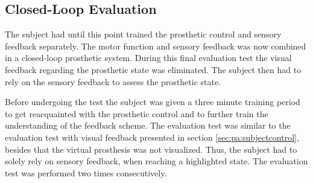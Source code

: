 

\subsection{Closed-Loop Evaluation}

The subject had until this point trained the prosthetic control and sensory feedback separately. The motor function and sensory feedback was now combined in a closed-loop prosthetic system. During this final evaluation test the visual feedback regarding the prosthetic state was eliminated. The subject then had to rely on the sensory feedback to assess the prosthetic state. 

Before undergoing the test the subject was given a three minute training period to get reacquainted with the prosthetic control and to further train the understanding of the feedback scheme. 
The evaluation test was similar to the evaluation test with visual feedback presented in section \ref{sec:pa:subjectcontrol}, besides that the virtual prosthesis was not visualized. Thus, the subject had to solely rely on sensory feedback, when reaching a highlighted state. The evaluation test was performed two times consecutively.